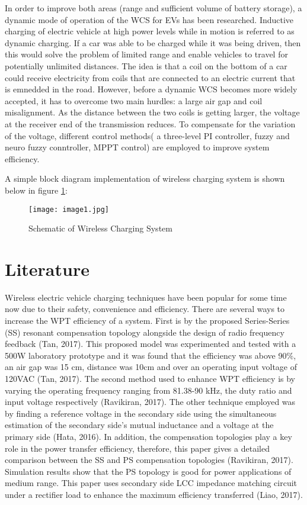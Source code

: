 \documentclass[12pt]{article}
\begin{document}
In order to improve both areas (range and sufficient volume of battery storage), a dynamic mode of operation of the WCS for EVs has been researched. Inductive charging of electric vehicle at high power levels while in motion is referred to as dynamic charging. If a car was able to be charged while it was being driven, then this would solve the problem of limited range and enable vehicles to travel for potentially unlimited distances. The idea is that a coil on the bottom of a car could receive electricity from coils that are connected to an electric current that is emnedded in the road. However, before a dynamic WCS becomes more widely accepted, it has to overcome two main hurdles: a large air gap and coil misalignment. As the distance between the two coils is getting larger, the voltage at the receiver end of the transmission reduces. To compensate for the variation of the voltage, different control methods( a three-level PI controller, fuzzy and neuro fuzzy conntroller, MPPT control) are employed to improve system efficiency. 

A simple block diagram implementation of wireless charging system is shown below in figure \ref{fig:scheme}:
\begin{figure}[h!]
	\centering
	\texttt{[image: image1.jpg]}
	\caption{Schematic of Wireless Charging System}
	\label{fig:scheme}
\end{figure}
\newpage
\section{Literature}
Wireless electric vehicle charging techniques have been popular for some time now due to their
safety, convenience and efficiency. There are several ways to increase the WPT efficiency of a system.
First is by the proposed Series-Series (SS) resonant compensation topology alongside the design of
radio frequency feedback (Tan, 2017). This proposed model was experimented and tested with a
500W laboratory prototype and it was found that the efficiency was above 90\%, an air gap was 15
cm, distance was 10cm and over an operating input voltage of 120VAC (Tan, 2017). The second
method used to enhance WPT efficiency is by varying the operating frequency ranging from 81.38-90 kHz, 
the duty ratio and input voltage respectively (Ravikiran, 2017). The other technique employed
was by finding a reference voltage in the secondary side using the simultaneous estimation of the
secondary side's mutual inductance and a voltage at the primary side (Hata, 2016). In addition, the
compensation topologies play a key role in the power transfer efficiency, therefore, this paper gives a
detailed comparison between the SS and PS compensation topologies (Ravikiran, 2017). Simulation
results show that the PS topology is good for power applications of medium range. This paper uses
secondary side LCC impedance matching circuit under a rectifier load to enhance the maximum
efficiency transferred (Liao, 2017).
\end{document}
